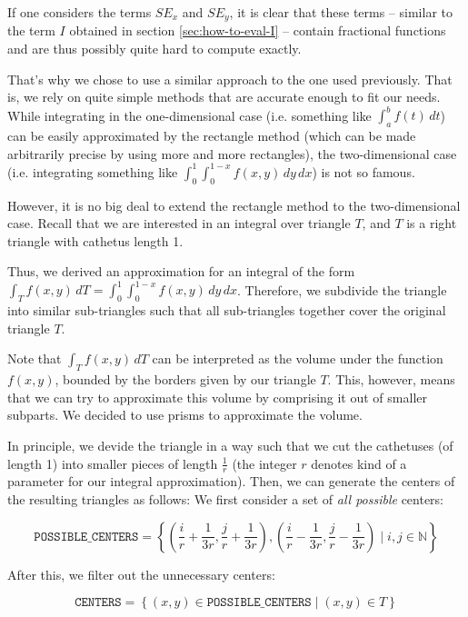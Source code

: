 \documentclass{article}
\begin{document}
If one considers the terms $SE_x$ and $SE_y$, it is clear that these terms -- similar to the term $I$ obtained in section \ref{sec:how-to-eval-I} -- contain fractional functions and are thus possibly quite hard to compute exactly.

That's why we chose to use a similar approach to the one used previously. That is, we rely on quite simple methods that are accurate enough to fit our needs. While integrating in the one-dimensional case (i.e. something like $\int_a^b f(t)\,dt$) can be easily approximated by the rectangle method (which can be made arbitrarily precise by using more and more rectangles), the two-dimensional case (i.e. integrating something like $\int_{0}^1 \int_0^{1-x} f(x,y)\, dy\, dx$) is not so famous.

However, it is no big deal to extend the rectangle method to the two-dimensional case. Recall that we are interested in an integral over triangle $T$, and $T$ is a right triangle with cathetus length 1.

Thus, we derived an approximation for an integral of the form $\int_T f(x,y)\, dT = \int_{0}^1 \int_0^{1-x} f(x,y)\, dy\, dx$. Therefore, we subdivide the triangle into similar sub-triangles such that all sub-triangles together cover the original triangle $T$. 

Note that $\int_T f(x,y)\,dT$ can be interpreted as the volume under the function $f(x,y)$, bounded by the borders given by our triangle $T$. This, however, means that we can try to approximate this volume by comprising it out of smaller subparts. We decided to use prisms to approximate the volume.

In principle, we devide the triangle in a way such that we cut the cathetuses (of length 1) into smaller pieces of length $\frac{1}{r}$ (the integer $r$ denotes kind of a parameter for our integral approximation). Then, we can generate the centers of the resulting triangles as follows: We first consider a set of \emph{all possible} centers:

\begin{equation*}
  \mathtt{POSSIBLE\_CENTERS} = \left\{ 
    \left(\frac{i}{r} + \frac{1}{3r}, \frac{j}{r} + \frac{1}{3r}\right) ,
    \left(\frac{i}{r} - \frac{1}{3r}, \frac{j}{r} - \frac{1}{3r}\right) 
    \mid
    i, j\in \mathbb{N}
  \right\}
\end{equation*}

After this, we filter out the unnecessary centers:

\begin{equation*}
  \mathtt{CENTERS} = \left\{ 
    (x,y)\in \mathtt{POSSIBLE\_CENTERS} 
    \mid 
    (x,y) \in T
  \right\}
\end{equation*}
\end{document}
